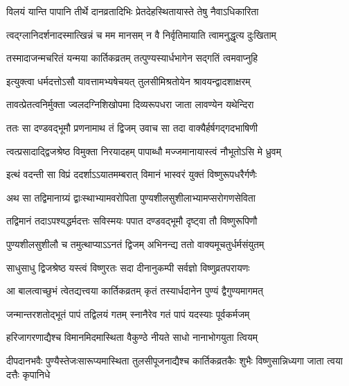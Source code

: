 


\twolineshloka
{विलयं यान्ति पापानि तीर्थे दानव्रतादिभिः}
{प्रेतदेहस्थितायास्ते तेषु नैवाऽधिकारिता} %

\twolineshloka
{त्वद्ग्लानिदर्शनादस्मात्खिन्नं च मम मानसम्}
{न वै निर्वृतिमायाति त्वामनुद्धृत्य दुःखिताम्} %

\twolineshloka
{तस्मादाजन्मचरितं यन्मया कार्तिकव्रतम्}
{तत्पुण्यस्यार्धभागेन सद्गतिं त्वमवाप्नुहि} %


\twolineshloka
{इत्युक्त्वा धर्मदत्तोऽसौ यावत्तामभ्यषेचयत्}
{तुलसीमिश्रतोयेन श्रावयन्द्वादशाक्षरम्} %

\twolineshloka
{तावत्प्रेतत्वनिर्मुक्ता ज्वलदग्निशिखोपमा}
{दिव्यरूपधरा जाता लावण्येन यथेन्दिरा} %

\twolineshloka
{ततः सा दण्डवद्भूमौ प्रणनामाथ तं द्विजम्}
{उवाच सा तदा वाक्यैर्हर्षगद्गदभाषिणी} %


\twolineshloka
{त्वत्प्रसादाद्द्विजश्रेष्ठ विमुक्ता निरयादहम्}
{पापाब्धौ मज्जमानायास्त्वं नौभूतोऽसि मे ध्रुवम्} %


\twolineshloka
{इत्थं वदन्ती सा विप्रं ददर्शाऽऽयातमम्बरात्}
{विमानं भास्वरं युक्तं विष्णुरूपधरैर्गणैः} %

\twolineshloka
{अथ सा तद्विमानाग्र्यं द्वाःस्थाभ्यामवरोपिता}
{पुण्यशीलसुशीलाभ्यामप्सरोगणसेविता} %

\twolineshloka
{तद्विमानं तदाऽपश्यद्धर्मदत्तः सविस्मयः}
{पपात दण्डवद्भूमौ दृष्ट्वा तौ विष्णुरूपिणौ} %

\twolineshloka
{पुण्यशीलसुशीलौ च तमुत्थाप्याऽऽनतं द्विजम्}
{अभिनन्द्य ततो वाक्यमूचतुर्धर्मसंयुतम्} %


\twolineshloka
{साधुसाधु द्विजश्रेष्ठ यस्त्वं विष्णुरतः सदा}
{दीनानुकम्पी सर्वज्ञो विष्णुव्रतपरायणः} %


\twolineshloka
{आ बालत्वाच्छुभं त्वेतद्यत्त्वया कार्तिकव्रतम्}
{कृतं तस्यार्धदानेन पुण्यं द्वैगुण्यमागमत्} %

\twolineshloka
{जन्मान्तरशतोद्भूतं पापं तद्विलयं गतम्}
{स्नानैरेव गतं पापं यदस्याः पूर्वकर्मजम्} %

\twolineshloka
{हरिजागरणाद्यैश्च विमानमिदमास्थिता}
{वैकुण्ठे नीयते साधो नानाभोगयुता त्वियम्} %

\threelineshloka
{दीपदानभवैः पुण्यैस्तेजःसारूप्यमास्थिता}
{तुलसीपूजनाद्यैश्च कार्तिकव्रतकैः शुभैः}
{विष्णुसान्निध्यगा जाता त्वया दत्तैः कृपानिधे} %


